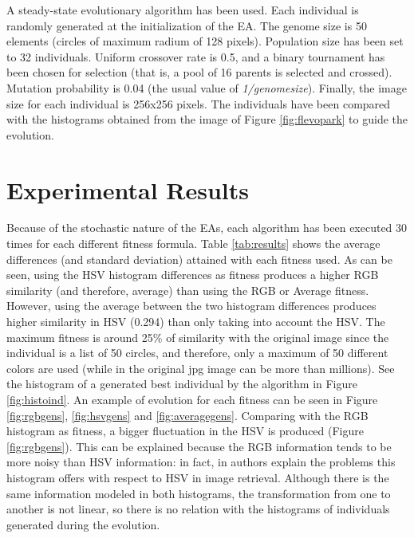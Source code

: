 {A steady-state evolutionary algorithm has been used. %
Each individual is randomly generated at the initialization of the EA. The genome size is 50 elements (circles of maximum radium of 128 pixels). Population size has been set to 32 individuals. Uniform crossover rate is 0.5, and a binary tournament has been chosen for selection (that is, a pool of 16 parents is selected and crossed). Mutation probability is 0.04 (the usual value of {\em 1/genomesize}). Finally, the image size for each individual is 256x256 pixels. The individuals have been compared with the histograms obtained from the image of Figure \ref{fig:flevopark} to guide the evolution. 

\section{Experimental Results}
\label{sec:results}

\noindent Because of the stochastic nature of the EAs, each algorithm
has been executed 30 times for each different fitness formula. Table
\ref{tab:results} shows the average differences (and standard
deviation) attained with each fitness used. As can be seen, using the
HSV histogram differences as fitness produces a higher RGB similarity
(and therefore, average) than using the RGB or Average
fitness. However, using the average between the two histogram
differences produces higher similarity in HSV (0.294) than only taking
into account the HSV. The maximum fitness is around 25\% of similarity
with the original image since the individual is a list of 50 circles,
and therefore, only a maximum of 50 different colors are used (while
in the original jpg image can be more than millions). See the
histogram of a generated best individual by the algorithm in Figure
\ref{fig:histoind}. An example of evolution for each fitness can be
seen in Figure \ref{fig:rgbgens}, \ref{fig:hsvgens} and
\ref{fig:averagegens}. Comparing with the RGB histogram as fitness, a
bigger fluctuation in the HSV is produced (Figure
\ref{fig:rgbgens}). This can be explained because the RGB information
tends to be more noisy than HSV information: in fact, in
\cite{COLORDIFFERENCES} authors explain the problems this histogram
offers with respect to HSV in image retrieval. Although there is the
same information modeled in both histograms, the transformation from
one to another is not linear, so there is no relation with the
histograms of individuals generated during the evolution. 

}
